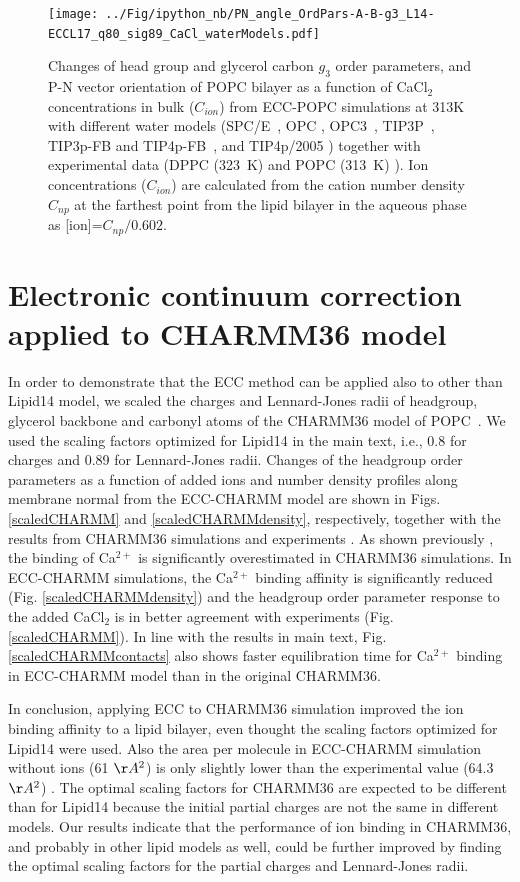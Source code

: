 \documentclass[journal=jpcbfk]{achemso}
\begin{document}
\begin{figure}[!hp]
  \centering
  \texttt{[image: ../Fig/ipython\_nb/PN\_angle\_OrdPars-A-B-g3\_L14-ECCL17\_q80\_sig89\_CaCl\_waterModels.pdf]}
  \caption{\label{fig:ordPars_waterModels}
    Changes of head group and glycerol carbon $g_3$ order parameters, and P-N vector orientation of POPC bilayer
    as a function of CaCl$_2$ concentrations in bulk ($C_{ion}$) from ECC-POPC simulations at 313K with different
    water models (SPC/E~\cite{Berendsen1987}, OPC \cite{Izadi14}, OPC3~\cite{Izadi16}, TIP3P~\cite{jorgensen83}, TIP3p-FB and TIP4p-FB~\cite{Wang2014}, and TIP4p/2005 \cite{Abascal2005})
    together with experimental data (DPPC (323~K) \cite{akutsu81} and POPC (313~K) \cite{altenbach84}). 
    Ion concentrations ($C_{ion}$) are calculated from the cation number density $C_{np}$
    at the farthest point from the lipid bilayer in the aqueous phase as [ion]=$C_{np}/0.602$.
  }
\end{figure}

\newpage
\section{Electronic continuum correction applied to CHARMM36 model}
In order to demonstrate that the ECC method can be applied also to other than Lipid14 model,
we scaled the charges and Lennard-Jones radii of headgroup, glycerol backbone and
carbonyl atoms of the CHARMM36 model of POPC~\cite{klauda10}. We used the
scaling factors optimized for Lipid14 in the main text, i.e., 0.8 for charges and 0.89 for Lennard-Jones
radii. Changes of the headgroup order parameters as a function of added ions
and number density profiles along membrane normal from the ECC-CHARMM model are shown 
in Figs. \ref{scaledCHARMM} and \ref{scaledCHARMMdensity}, respectively,
together with the results from CHARMM36 simulations \cite{catte16,charmmPOPC450mMCaClfiles}
and experiments \cite{akutsu81,altenbach84}. As shown previously \cite{catte16},
the binding of Ca$^{2+}$ is significantly overestimated in CHARMM36 simulations.
In ECC-CHARMM simulations, the Ca$^{2+}$ binding affinity 
is significantly reduced (Fig. \ref{scaledCHARMMdensity}) and the headgroup order parameter response to the added CaCl$_2$
 is in better agreement with experiments (Fig. \ref{scaledCHARMM}).
In line with the results in main text,
Fig. \ref{scaledCHARMMcontacts} also shows faster equilibration time
for Ca$^{2+}$ binding in ECC-CHARMM model than in the original CHARMM36.

In conclusion, applying ECC to CHARMM36 simulation
improved the ion binding affinity to a lipid bilayer, even thought the
scaling factors optimized for Lipid14 were used. Also the area per molecule in
ECC-CHARMM simulation without ions (61 $\AA^2$) is only slightly
lower than the experimental value (64.3 $\AA^2$) \cite{kucerka11}. 
The optimal scaling factors for CHARMM36 are expected to be different
than for Lipid14 because the initial partial charges are not the same
in different models. Our results indicate that the performance of ion
binding in CHARMM36, and probably in other lipid models as well, could
be further improved by finding the optimal scaling factors for the partial
charges and Lennard-Jones radii.
\end{document}
